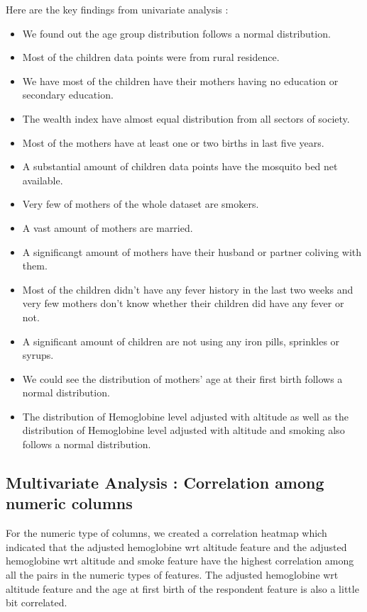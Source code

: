 Here are the key findings from univariate analysis :
\begin{itemize}
	\item We found out the age group distribution follows a normal distribution.
	\item Most of the children data points were from rural residence.
	\item We have most of the children have their mothers having no education or secondary education.
	\item The wealth index have almost equal distribution from all sectors of society.
	\item Most of the mothers have at least one or two births in last five years.
	\item A substantial amount of children data points have the mosquito bed net available.
	\item Very few of mothers of the whole dataset are smokers.
	\item A vast amount of mothers are married.
	\item A significangt amount of mothers have their husband or partner coliving with them.
	\item Most of the children didn't have any fever history in the last two weeks and very few mothers don't know whether their children did have any fever or not.
	\item A significant amount of children are not using any iron pills, sprinkles or syrups.
	\item We could see the distribution of mothers' age at their first birth follows a normal distribution.
	\item The distribution of Hemoglobine level adjusted with altitude as well as the distribution of Hemoglobine level adjusted with altitude and smoking also follows a normal distribution.
\end{itemize}





\subsection{Multivariate Analysis : Correlation among numeric columns}

For the numeric type of columns, we created a correlation heatmap which indicated that the adjusted hemoglobine wrt altitude feature and the adjusted hemoglobine wrt altitude and smoke feature have the highest correlation among all the pairs in the numeric types of features. The adjusted hemoglobine wrt altitude feature and the age at first birth of the respondent feature is also a little bit correlated.



